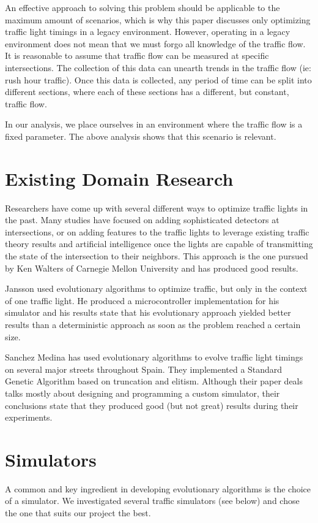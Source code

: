 \documentclass{article} %
\begin{document}
An effective approach to solving this problem should be applicable to the maximum amount of scenarios, which is why this paper discusses only optimizing traffic light timings in a legacy environment.
However, operating in a legacy environment does not mean that we must forgo all knowledge of the traffic flow. It is reasonable to assume that traffic flow can be measured at specific intersections. The collection of this data can unearth trends in the traffic flow (ie: rush hour traffic). Once this data is collected, any period of time can be split into different sections, where each of these sections has a different, but constant, traffic flow.


In our analysis, we place ourselves in an environment where the traffic flow is a fixed parameter. The above analysis shows that this scenario is relevant.

\section{Existing Domain Research}
Researchers have come up with several different ways to optimize traffic lights in the past. Many studies have focused on adding sophisticated detectors at intersections, or on adding features to the traffic lights to leverage existing traffic theory results and artificial intelligence once the lights are capable of transmitting the state of the intersection to their neighbors. This approach is the one pursued by Ken Walters of Carnegie Mellon University and has produced good results.

Jansson used evolutionary algorithms to optimize traffic, but only in the context of one traffic light. He produced a microcontroller implementation for his simulator and his results state that his evolutionary approach yielded better results than a deterministic approach as soon as the problem reached a certain size.

Sanchez Medina has used evolutionary algorithms to evolve traffic light timings on several major streets throughout Spain. They implemented a Standard Genetic Algorithm based on truncation and elitism. Although their paper deals talks mostly about designing and programming a custom simulator, their conclusions state that they produced good (but not great) results during their experiments.


\section{Simulators}
\label{gen_inst}
A common and key ingredient in developing evolutionary algorithms is the choice of a simulator. We investigated several traffic simulators (see below) and chose the one that suits our project the best.
\end{document}
